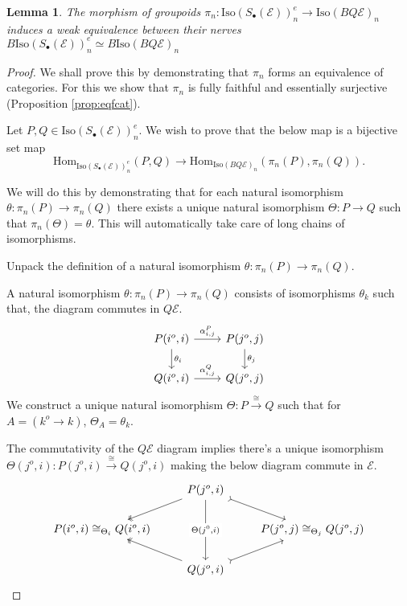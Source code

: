 \documentclass[12pt]{report}
\numberwithin{equation}{section}
\newtheorem{lemma}[dummy]{Lemma}
\begin{document}
	\begin{lemma}\label{lem:isoSisoBQEeq}
		The morphism of groupoids \( \pi_n: \mathrm{Iso}(S_\bullet (\mathcal{E}))^e_n \to \mathrm{Iso}(BQ\mathcal{E})_n \) induces a weak equivalence between their nerves \( B\mathrm{Iso}(S_\bullet (\mathcal{E}))^e_n \simeq B\mathrm{Iso}(BQ\mathcal{E})_n \)
	\end{lemma}
	\begin{proof}
			We shall prove this by demonstrating that \( \pi_n  \) forms an equivalence of categories. For this we show that \( \pi_n \) is fully faithful and essentially surjective (Proposition \ref{prop:eqfcat}).
			
			
			Let \( P, Q \in \mathrm{Iso}(S_\bullet (\mathcal{E}))^e_n\). We wish to prove that the below map is a bijective set map \[ \mathrm{Hom}_{\mathrm{Iso}(S_\bullet(\mathcal{E}))^e_n}(P,Q) \longrightarrow \mathrm{Hom}_{\mathrm{Iso}(BQ\mathcal{E})_n}(\pi_n(P), \pi_n(Q)). \]
			
			We will do this by demonstrating that for each natural isomorphism \( \theta: \pi_n(P) \to \pi_n(Q) \) there exists a unique natural isomorphism \( \Theta:P \to Q \) such that \( \pi_n (\Theta)=\theta \). This will automatically take care of long chains of isomorphisms.
			
			Unpack the definition of a natural isomorphism \( \theta: \pi_n(P) \to \pi_n(Q) \).
			
			A natural isomorphism \( \theta: \pi_n(P) \to \pi_n(Q) \) consists of isomorphisms \( \theta_k \) such that, the diagram commutes in \( Q \mathcal{E} \).
			\[
			\begin{tikzcd}
				P(i^o, i) \arrow[r, "\alpha^P_{i,j}"] \arrow[d, "\theta_i"] & P(j^o, j) \arrow[d, "\theta_j"] \\
				Q(i^o, i) \arrow[r, "\alpha^Q_{i,j}"] & Q(j^o, j)
			\end{tikzcd}
			\]
			 We construct a unique natural isomorphism \( \Theta: P \xrightarrow{\cong} Q \) such that for $A=(k^o \to k)$, \( \Theta_A = \theta_k \).
			
			The commutativity of the $Q\mathcal{E}$ diagram implies there's a unique isomorphism \( \Theta (j^o,i) : P(j^o,i) \xrightarrow{\cong} Q(j^o,i) \) making the below diagram commute in $\mathcal{E}$. 
			\[\begin{tikzcd}
				& {P(j^o,i)} \\
				{P(i^o,i)\cong_{\Theta_i} Q(i^o,i)} && {P(j^o,j)\cong_{\Theta_j} Q(j^o,j)} \\
				& {Q(j^o,i)}
				\arrow[two heads, from=1-2, to=2-1]
				\arrow[tail, from=1-2, to=2-3]
				\arrow["{\Theta(j^0,i)}"{description}, from=1-2, to=3-2]
				\arrow[two heads, from=3-2, to=2-1]
				\arrow[tail, from=3-2, to=2-3]
			\end{tikzcd}\]
			

\end{proof}
\end{document}
